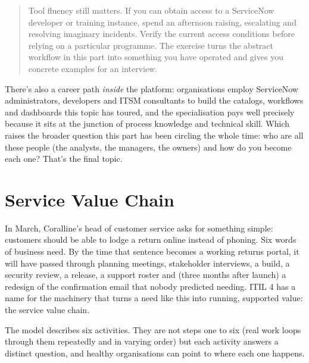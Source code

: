 \begin{quote}\small
Tool fluency still matters. If you can obtain access to a ServiceNow developer or training instance, spend an afternoon raising, escalating and resolving imaginary incidents. Verify the current access conditions before relying on a particular programme. The exercise turns the abstract workflow in this part into something you have operated and gives you concrete examples for an interview.
\end{quote}


There's also a career path \emph{inside} the platform: organisations employ ServiceNow administrators, developers and ITSM consultants to build the catalogs, workflows and dashboards this topic has toured, and the specialisation pays well precisely because it sits at the junction of process knowledge and technical skill. Which raises the broader question this part has been circling the whole time: who are all these people (the analysts, the managers, the owners) and how do you become each one? That's the final topic.

\section{Service Value Chain}
In March, Coralline's head of customer service asks for something simple: customers should be able to lodge a return online instead of phoning. Six words of business need. By the time that sentence becomes a working returns portal, it will have passed through planning meetings, stakeholder interviews, a build, a security review, a release, a support roster and (three months after launch) a redesign of the confirmation email that nobody predicted needing. ITIL 4 has a name for the machinery that turns a need like this into running, supported value: the service value chain.


The model describes six activities. They are not steps one to six (real work loops through them repeatedly and in varying order) but each activity answers a distinct question, and healthy organisations can point to where each one happens.


